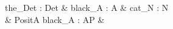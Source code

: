 \documentclass{article}
\begin{document}
    \begin{dependency}
        \begin{deptext}[column sep=0.4cm]
              the\_Det : Det \& black\_A : A \& cat\_N : N \\
              \& PositA black\_A : AP \&  \\
        \end{deptext}
    \end{dependency}
\end{document}
